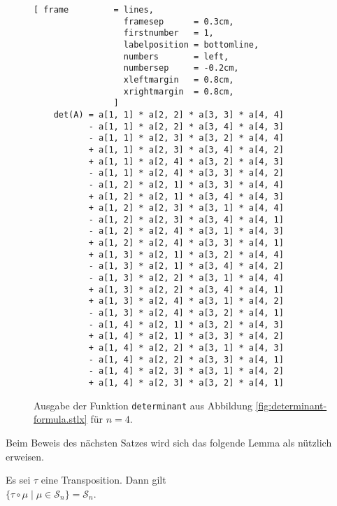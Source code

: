 \begin{figure}[!ht]
\centering
\begin{Verbatim}[ frame         = lines, 
                  framesep      = 0.3cm, 
                  firstnumber   = 1,
                  labelposition = bottomline,
                  numbers       = left,
                  numbersep     = -0.2cm,
                  xleftmargin   = 0.8cm,
                  xrightmargin  = 0.8cm,
                ]
    det(A) = a[1, 1] * a[2, 2] * a[3, 3] * a[4, 4]
           - a[1, 1] * a[2, 2] * a[3, 4] * a[4, 3]
           - a[1, 1] * a[2, 3] * a[3, 2] * a[4, 4]
           + a[1, 1] * a[2, 3] * a[3, 4] * a[4, 2]
           + a[1, 1] * a[2, 4] * a[3, 2] * a[4, 3]
           - a[1, 1] * a[2, 4] * a[3, 3] * a[4, 2]
           - a[1, 2] * a[2, 1] * a[3, 3] * a[4, 4]
           + a[1, 2] * a[2, 1] * a[3, 4] * a[4, 3]
           + a[1, 2] * a[2, 3] * a[3, 1] * a[4, 4]
           - a[1, 2] * a[2, 3] * a[3, 4] * a[4, 1]
           - a[1, 2] * a[2, 4] * a[3, 1] * a[4, 3]
           + a[1, 2] * a[2, 4] * a[3, 3] * a[4, 1]
           + a[1, 3] * a[2, 1] * a[3, 2] * a[4, 4]
           - a[1, 3] * a[2, 1] * a[3, 4] * a[4, 2]
           - a[1, 3] * a[2, 2] * a[3, 1] * a[4, 4]
           + a[1, 3] * a[2, 2] * a[3, 4] * a[4, 1]
           + a[1, 3] * a[2, 4] * a[3, 1] * a[4, 2]
           - a[1, 3] * a[2, 4] * a[3, 2] * a[4, 1]
           - a[1, 4] * a[2, 1] * a[3, 2] * a[4, 3]
           + a[1, 4] * a[2, 1] * a[3, 3] * a[4, 2]
           + a[1, 4] * a[2, 2] * a[3, 1] * a[4, 3]
           - a[1, 4] * a[2, 2] * a[3, 3] * a[4, 1]
           - a[1, 4] * a[2, 3] * a[3, 1] * a[4, 2]
           + a[1, 4] * a[2, 3] * a[3, 2] * a[4, 1]
\end{Verbatim}
\vspace*{-0.3cm}
\caption{Ausgabe der Funktion \texttt{determinant} aus Abbildung \ref{fig:determinant-formula.stlx} f\"ur $n=4$.}
\label{fig:determinant.out}
\end{figure}
Beim Beweis des n\"achsten Satzes wird sich das folgende Lemma als n\"utzlich erweisen.

\begin{Lemma} \label{lemma:sigmatau}
Es sei $\tau$ eine Transposition.  Dann gilt
\\[0.2cm]
\hspace*{1.3cm}
$\{ \tau \circ \mu \mid \mu \in \mathcal{S}_n \} = \mathcal{S}_n$.
\end{Lemma}

